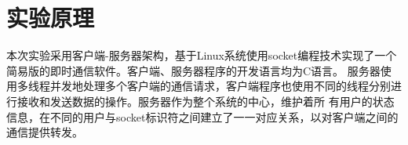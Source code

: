 \section{实验原理}
本次实验采用客户端-服务器架构，基于Linux系统使用socket编程技术实现了一个简易版的即时通信软件。客户端、服务器程序的开发语言均为C语言。
服务器使用多线程并发地处理多个客户端的通信请求，客户端程序也使用不同的线程分别进行接收和发送数据的操作。服务器作为整个系统的中心，维护着所
有用户的状态信息，在不同的用户与socket标识符之间建立了一一对应关系，以对客户端之间的通信提供转发。
